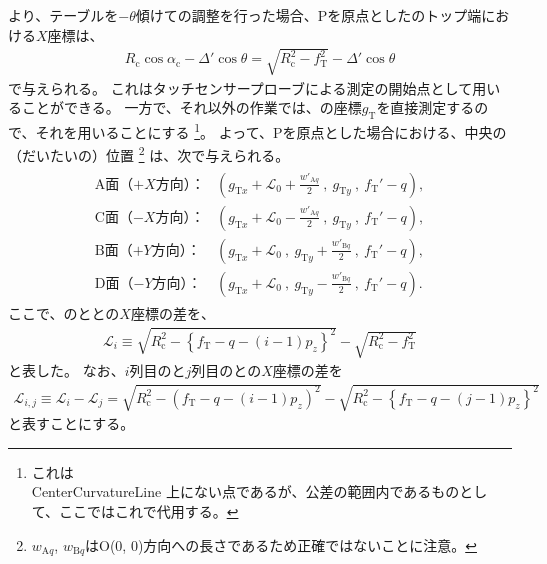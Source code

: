 \clearpage
より、テーブルを$-\theta$傾けて\AlocationLength の調整を行った場合、\TableCenter Pを原点とした\CenterCurvatureLine のトップ端における$X$座標は、
\begin{align*}
  R_\mathrm c\cos\alpha_\mathrm c-\Delta'\cos\theta = \sqrt{R_\mathrm c^2-f_\mathrm T^2}-\Delta'\cos\theta
\end{align*}
で与えられる。
これはタッチセンサープローブによる測定の開始点として用いることができる。
一方で、それ以外の作業では、\TopIDCenter の座標$g_\mathrm T$を直接測定するので、それを用いることにする
\footnote{これは\\CenterCurvatureLine 上にない点であるが、公差の範囲内であるものとして、ここではこれで代用する。}。
よって、\TableCenter Pを原点とした場合における、\DimpleFirstRow 中央の（だいたいの）位置
\footnote{$w_{\mathrm Aq}$, $w_{\mathrm Bq}$は\CurvatureCenter{}O(0, 0)方向への長さであるため正確ではないことに注意。}\relax
は、次で与えられる。
\begin{align*}
\begin{array}{rl}
  \text{A面（$+X$方向）：}
  & \displaystyle
    \left(
      g_{\mathrm Tx}+\mathcal L_0+\frac{w'_{\mathrm Aq}}2~,~
      g_{\mathrm Ty}~,~
      f_\mathrm T'-q
    \right),\\[12pt]
  \text{C面（$-X$方向）：}
  & \displaystyle
    \left(
      g_{\mathrm Tx}+\mathcal L_0-\frac{w'_{\mathrm Aq}}2~,~
      g_{\mathrm Ty}~,~
      f_\mathrm T'-q
    \right),\\[12pt]
  \text{B面（$+Y$方向）：}
  & \displaystyle
    \left(
      g_{\mathrm Tx}+\mathcal L_0~,~
      g_{\mathrm Ty}+\frac{w'_{\mathrm Bq}}2~,~
      f_\mathrm T'-q
    \right),\\[12pt]
  \text{D面（$-Y$方向）：}
  & \displaystyle
    \left(
      g_{\mathrm Tx}+\mathcal L_0~,~
      g_{\mathrm Ty}-\frac{w'_{\mathrm Bq}}2~,~
      f_\mathrm T'-q
    \right).
\end{array}
\end{align*}
ここで、\DimpleIRow の\CurvatureCenter と\TopCurvatureCenter との$X$座標の差を、
\begin{align}
  \label{eq:dimpleCenterDistance}
  \mathcal L_i
  \equiv \sqrt{R_\mathrm c^2-\left\{f_\mathrm T-q-(i-1)p_z\right\}^2}-\sqrt{R_\mathrm c^2-f_\mathrm T^2}
\end{align}
と表した。
なお、$i$列目の\CurvatureCenter と$j$列目の\CurvatureCenter との$X$座標の差を
\begin{align*}
  \mathcal L_{i,j}
  \equiv \mathcal L_i-\mathcal L_j
  = \sqrt{R_\mathrm c^2-\left(f_\mathrm T-q-(i-1)p_z\right)^2}
    -\sqrt{R_\mathrm c^2-\left\{f_\mathrm T-q-(j-1)p_z\right\}^2}
\end{align*}
と表すことにする。


